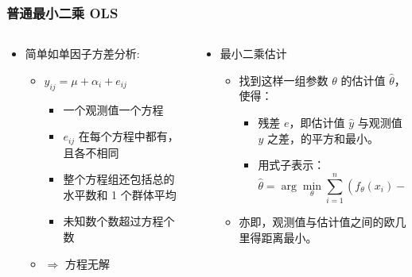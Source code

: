 \documentclass[serif,aspectratio=169]{beamer}
\begin{document}
\begin{frame}
  \frametitle{普通最小二乘 OLS}
  \begin{columns}
    \begin{column}{.5\textwidth}
      \begin{itemize}
      \item 简单如单因子方差分析:
        \begin{itemize}
        \item $y_{ij}=\mu+\alpha_i+e_{ij}$
          \begin{itemize}
          \item 一个观测值一个方程
          \item $e_{ij}$ 在每个方程中都有，且各不相同
          \item 整个方程组还包括总的水平数和 1 个群体平均
          \item 未知数个数超过方程个数
          \end{itemize}
        \item $\Rightarrow$ 方程无解
        \end{itemize}
      \end{itemize}
    \end{column}
    \pause
    \begin{column}{.5\textwidth}
      \begin{itemize}
      \item 最小二乘估计
        \begin{itemize}
        \item 找到这样一组参数 $\theta$ 的估计值 $\hat\theta$，使得：
          \begin{itemize}
          \item 残差 $e$，即估计值 $\hat{y}$ 与观测值 $y$ 之差，的平方和最小。
          \item 用式子表示：
            $$\hat\theta=\arg\min_{\theta}\sum_{i=1}^n(f_{\theta}(x_i)-y_i)^2$$
          \end{itemize}
        \item 亦即，观测值与估计值之间的欧几里得距离最小。
        \end{itemize}
      \end{itemize}
    \end{column}
  \end{columns}
\end{frame}
\end{document}
